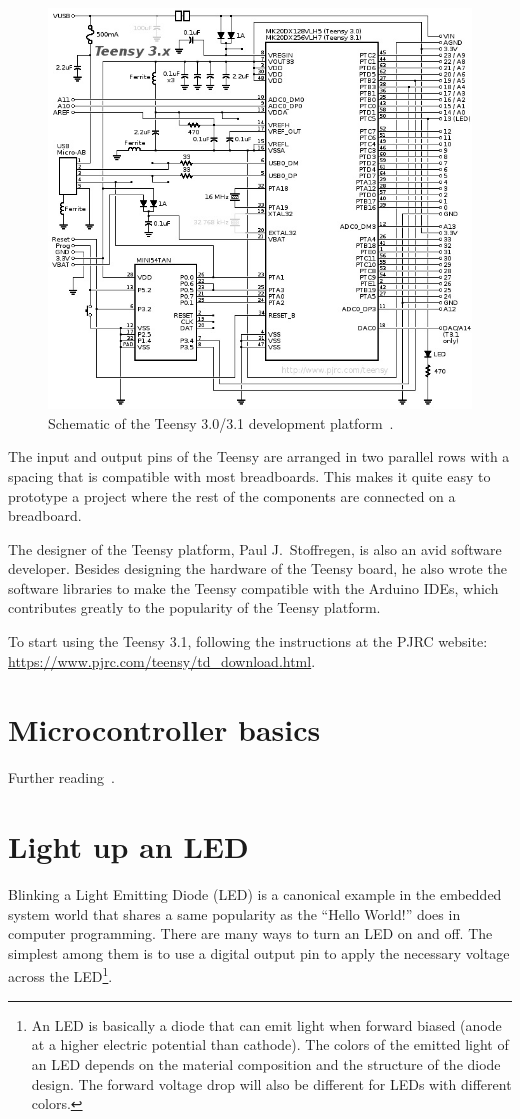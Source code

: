\documentclass[letterpaper, 11pt]{article}
\begin{document}
\begin{figure}[ht]
	\centering
	\includegraphics[width=4.5in]{teensy_sch.png}
	\caption{Schematic of the Teensy 3.0/3.1 development platform~\cite{bib:teensy_sch}.}
	\label{fig:teensy_sch}
\end{figure}


The input and output pins of the Teensy are arranged in two parallel rows with a spacing that is compatible with most breadboards. This makes it quite easy to prototype a project where the rest of the components are connected on a breadboard.

The designer of the Teensy platform, Paul J.~Stoffregen, is also an avid software developer. Besides designing the hardware of the Teensy board, he also wrote the software libraries to make the Teensy compatible with the Arduino IDEs, which contributes greatly to the popularity of the Teensy platform. 

To start using the Teensy 3.1, following the instructions at the PJRC website: \url{https://www.pjrc.com/teensy/td_download.html}.


\section{Microcontroller basics}

Further reading~\cite{bib:uC_intro1, bib:uC_intro2}.

\section{Light up an LED}
Blinking a Light Emitting Diode (LED) is a canonical example in the embedded system world that shares a same popularity as the ``Hello World!'' does in computer programming. There are many ways to turn an LED on and off. The simplest among them is to use a digital output pin to apply the necessary voltage across the LED\footnote{An LED is basically a diode that can emit light when forward biased (anode at a higher electric potential than cathode). The colors of the emitted light of an LED depends on the material composition and the structure of the diode design. The forward voltage drop will also be different for LEDs with different colors.}. 
\end{document}
